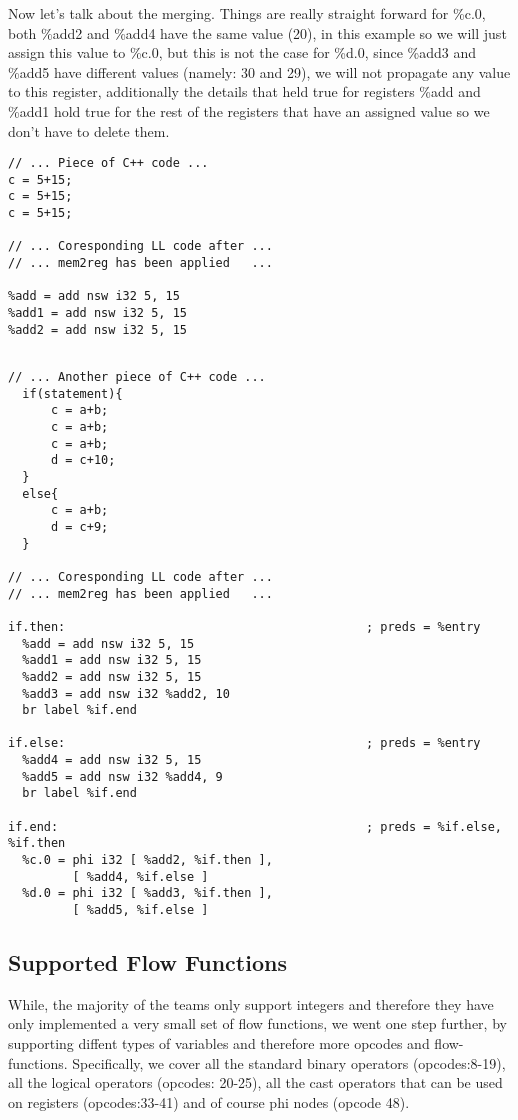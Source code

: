 Now let's talk about the merging. Things are really straight forward for \%c.0, both \%add2 and \%add4 have the same value (20), in this example so we will just assign this value to \%c.0, but this is not the case for \%d.0, since \%add3 and \%add5 have different values (namely: 30 and 29), we will not propagate any value to this register, additionally the details that held true for registers \%add and \%add1 hold true for the rest of the registers that have an assigned value so we don't have to delete them. 


\begin{lstlisting}[caption=SSA preview, label=SSA]
// ... Piece of C++ code ...
c = 5+15;
c = 5+15;
c = 5+15;

// ... Coresponding LL code after ...
// ... mem2reg has been applied   ...

%add = add nsw i32 5, 15
%add1 = add nsw i32 5, 15
%add2 = add nsw i32 5, 15

\end{lstlisting}

\begin{lstlisting}[caption=SSA within a branch preview, label=SSAFF]

// ... Another piece of C++ code ...
  if(statement){
	  c = a+b;
	  c = a+b;
	  c = a+b;
	  d = c+10;
  }
  else{
	  c = a+b;
	  d = c+9;
  }

// ... Coresponding LL code after ...
// ... mem2reg has been applied   ...

if.then:                                          ; preds = %entry
  %add = add nsw i32 5, 15
  %add1 = add nsw i32 5, 15
  %add2 = add nsw i32 5, 15
  %add3 = add nsw i32 %add2, 10
  br label %if.end

if.else:                                          ; preds = %entry
  %add4 = add nsw i32 5, 15
  %add5 = add nsw i32 %add4, 9
  br label %if.end

if.end:                                           ; preds = %if.else, %if.then
  %c.0 = phi i32 [ %add2, %if.then ], 
         [ %add4, %if.else ]
  %d.0 = phi i32 [ %add3, %if.then ], 
         [ %add5, %if.else ]

  \end{lstlisting}
  
  
\subsection*{Supported Flow Functions}
While, the majority of the teams only support integers and therefore they have only implemented a very small set of flow functions, we went one step further, by supporting diffent types of variables and therefore more opcodes and flow-functions. Specifically, we cover all the standard binary operators (opcodes:8-19), all the logical operators (opcodes: 20-25), all the cast operators that can be used on registers (opcodes:33-41) and of course phi nodes (opcode 48). 



